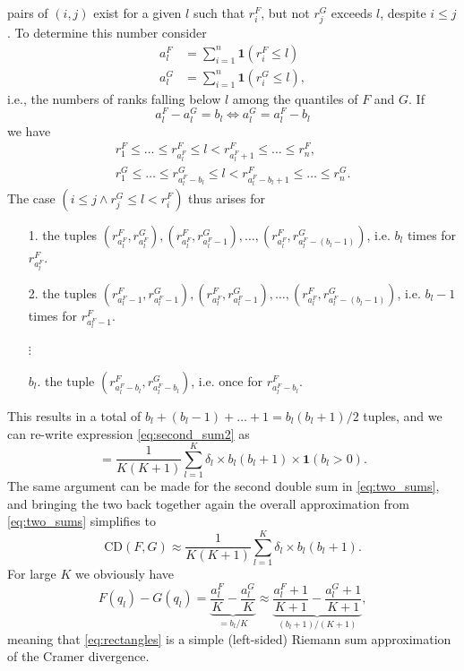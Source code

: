 \documentclass[
]{article}
\begin{document}
pairs of \((i, j)\) exist for a given \(l\) such that \(r^F_i\), but not
\(r^G_j\) exceeds \(l\), despite \(i \leq j\). To determine this number
consider \begin{align}
a^F_l & = \sum_{i = 1}^n \mathbf{1}(r^F_i \leq l)\\
a^G_l & = \sum_{i = 1}^n \mathbf{1}(r^G_i \leq l),
\end{align} i.e., the numbers of ranks falling below \(l\) among the
quantiles of \(F\) and \(G\). If \[
a_l^F - a_l^G = b_l \Leftrightarrow a_l^G = a_l^F - b_l
\] we have \begin{align}
r^F_{1} \leq \dots \leq r^F_{a_l^F} \leq l <  r^F_{a_l^F + 1} \leq \dots \leq r^F_n,\\
r^G_{1} \leq \dots \leq r^G_{a_l^F - b_l} \leq l <  r^F_{a_l^F - b_l + 1} \leq \dots \leq r^G_n.
\end{align} The case \((i \leq j \land r^G_j \leq l < r^F_i)\) thus
arises for

\begin{itemize}
\item[1.] the tuples $(r^F_{a^F_l}, r^G_{a^F_l}), (r^F_{a^F_l}, r^G_{a^F_l - 1}), \dots, (r^F_{a^F_l}, r^G_{a^F_l - (b_l - 1)})$, i.e. $b_l$ times for $r^F_{a^F_l}$.
\item[2.] the tuples $(r^F_{a^F_l - 1}, r^G_{a^F_l - 1}), (r^F_{a^F_l}, r^G_{a^F_l - 1}), \dots, (r^F_{a^F_l}, r^G_{a^F_l - (b_l - 1)})$, i.e. $b_l - 1$ times for $r^F_{a^F_l - 1}$.
\item[$\vdots$]
\item[$b_l$.] the tuple $(r^F_{a^F_l - b_l}, r^G_{a^F_l - b_l})$, i.e. once for $r^F_{a^F_l - b_l}$.
\end{itemize}

This results in a total of
\(b_l + (b_l -1) + \dots + 1 = b_l(b_l + 1)/2\) tuples, and we can
re-write expression \eqref{eq:second_sum2} as \[
= \frac{1}{K(K + 1)} \sum_{l = 1}^{K} \delta_l \times b_l(b_l + 1) \times \mathbf{1}(b_l > 0).
\] The same argument can be made for the second double sum in
\eqref{eq:two_sums}, and bringing the two back together again the
overall approximation from \eqref{eq:two_sums} simplifies to
\begin{equation}
\text{CD}(F, G) \approx \frac{1}{K(K + 1)} \sum_{l = 1}^{K} \delta_l \times b_l(b_l + 1). \label{eq:rectangles}
\end{equation} For large \(K\) we obviously have \begin{equation}
F(q_l) - G(q_l) = \underbrace{\frac{a^F_l}{K} - \frac{a^G_l}{K}}_{= b_l/K} \approx \underbrace{\frac{a^F_l + 1}{K + 1} - \frac{a^G_l + 1}{K + 1}}_{(b_l + 1)/(K + 1)}, \label{eq:approx_CDF}
\end{equation} meaning that \eqref{eq:rectangles} is a simple
(left-sided) Riemann sum approximation of the Cramer divergence.
\end{document}
